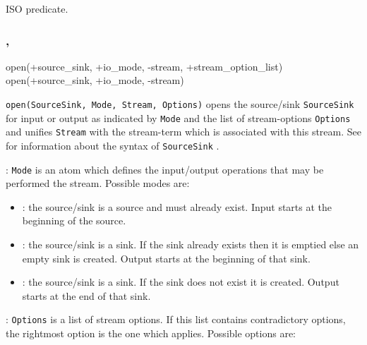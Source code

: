 ISO predicate.

\subsubsection{,\label{open/4}
               }


\begin{TemplatesOneCol}
open(+source\_sink, +io\_mode, -stream, +stream\_option\_list)\\
open(+source\_sink, +io\_mode, -stream)

\end{TemplatesOneCol}

\Description

\texttt{open(SourceSink, Mode, Stream, Options)} opens the source/sink
\texttt{SourceSink} for input or output as indicated by \texttt{Mode} and
the list of stream-options \texttt{Options} and unifies \texttt{Stream} with
the stream-term which is associated with this stream. See
 for information about the syntax of
\texttt{SourceSink} .

: \texttt{Mode} is an atom which defines the
input/output operations that may be performed the stream. Possible modes
are:

\begin{itemize}

\item {}: the source/sink is a source and must already exist.
Input starts at the beginning of the source.

\item {}: the source/sink is a sink. If the sink already exists
then it is emptied else an empty sink is created. Output starts at the
beginning of that sink.

\item {}: the source/sink is a sink. If the sink does not exist
it is created. Output starts at the end of that sink.

\end{itemize}

: \texttt{Options} is a list of stream options. If
this list contains contradictory options, the rightmost option is the one
which applies. Possible options are:

